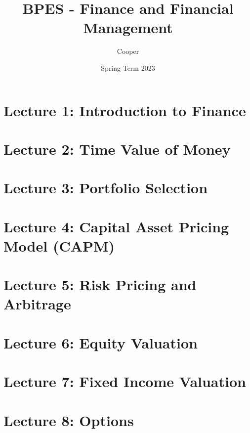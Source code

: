 \documentclass{article}
\title{BPES - Finance and Financial Management}
\author{Cooper}
\date{Spring Term 2023}
\begin{document}
\maketitle
\tableofcontents
\newpage


\section{Lecture 1: Introduction to Finance}


\newpage
\section{Lecture 2: Time Value of Money }


\newpage
\section{Lecture 3: Portfolio Selection}


\newpage
\section{Lecture 4: Capital Asset Pricing Model (CAPM)}


\newpage
\section{Lecture 5: Risk Pricing and Arbitrage}


\newpage
\section{Lecture 6: Equity Valuation}


\newpage
\section{Lecture 7: Fixed Income Valuation}


\newpage
\section{Lecture 8: Options}






\end{document}
